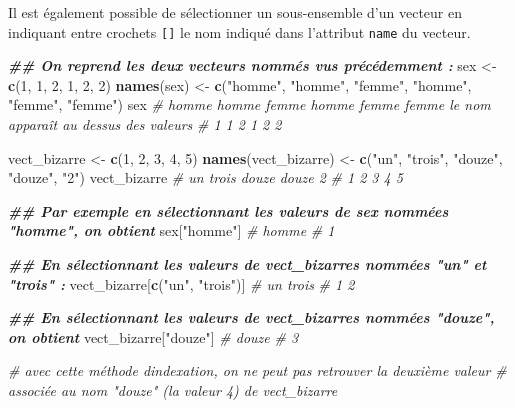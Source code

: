\documentclass[
]{book}
\newenvironment{Shaded}{\begin{snugshade}}{\end{snugshade}}
\newcommand{\CommentTok}[1]{\textcolor[rgb]{0.56,0.35,0.01}{\textit{#1}}}
\newcommand{\DecValTok}[1]{\textcolor[rgb]{0.00,0.00,0.81}{#1}}
\newcommand{\DocumentationTok}[1]{\textcolor[rgb]{0.56,0.35,0.01}{\textbf{\textit{#1}}}}
\newcommand{\FunctionTok}[1]{\textcolor[rgb]{0.13,0.29,0.53}{\textbf{#1}}}
\newcommand{\NormalTok}[1]{#1}
\newcommand{\OtherTok}[1]{\textcolor[rgb]{0.56,0.35,0.01}{#1}}
\newcommand{\StringTok}[1]{\textcolor[rgb]{0.31,0.60,0.02}{#1}}
\begin{document}
Il est également possible de sélectionner un sous-ensemble d'un vecteur en indiquant entre crochets \texttt{{[}{]}} le nom indiqué dans l'attribut \texttt{name} du vecteur.

\begin{Shaded}
\begin{Highlighting}[]
\DocumentationTok{\#\# On reprend les deux vecteurs nommés vus précédemment :}
\NormalTok{sex }\OtherTok{\textless{}{-}} \FunctionTok{c}\NormalTok{(}\DecValTok{1}\NormalTok{, }\DecValTok{1}\NormalTok{, }\DecValTok{2}\NormalTok{, }\DecValTok{1}\NormalTok{, }\DecValTok{2}\NormalTok{, }\DecValTok{2}\NormalTok{)}
\FunctionTok{names}\NormalTok{(sex) }\OtherTok{\textless{}{-}} \FunctionTok{c}\NormalTok{(}\StringTok{"homme"}\NormalTok{, }\StringTok{"homme"}\NormalTok{, }\StringTok{"femme"}\NormalTok{, }\StringTok{"homme"}\NormalTok{, }\StringTok{"femme"}\NormalTok{, }\StringTok{"femme"}\NormalTok{)}
\NormalTok{sex}
\CommentTok{\# homme homme femme homme femme femme     le nom apparaît au dessus des valeurs}
\CommentTok{\#     1     1     2     1     2     2}

\NormalTok{vect\_bizarre }\OtherTok{\textless{}{-}} \FunctionTok{c}\NormalTok{(}\DecValTok{1}\NormalTok{, }\DecValTok{2}\NormalTok{, }\DecValTok{3}\NormalTok{, }\DecValTok{4}\NormalTok{, }\DecValTok{5}\NormalTok{)}
\FunctionTok{names}\NormalTok{(vect\_bizarre) }\OtherTok{\textless{}{-}} \FunctionTok{c}\NormalTok{(}\StringTok{"un"}\NormalTok{, }\StringTok{"trois"}\NormalTok{, }\StringTok{"douze"}\NormalTok{, }\StringTok{"douze"}\NormalTok{, }\StringTok{"2"}\NormalTok{)}
\NormalTok{vect\_bizarre}
\CommentTok{\# un trois douze douze     2 }
\CommentTok{\#  1     2     3     4     5}

\DocumentationTok{\#\# Par exemple en sélectionnant les valeurs de sex nommées "homme", on obtient}
\NormalTok{sex[}\StringTok{"homme"}\NormalTok{]}
\CommentTok{\# homme }
\CommentTok{\#     1}

\DocumentationTok{\#\# En sélectionnant les valeurs de vect\_bizarres nommées "un" et "trois" :}
\NormalTok{vect\_bizarre[}\FunctionTok{c}\NormalTok{(}\StringTok{"un"}\NormalTok{, }\StringTok{"trois"}\NormalTok{)]}
\CommentTok{\# un trois }
\CommentTok{\#  1     2}

\DocumentationTok{\#\# En sélectionnant les valeurs de vect\_bizarres nommées "douze", on obtient}
\NormalTok{vect\_bizarre[}\StringTok{"douze"}\NormalTok{]}
\CommentTok{\# douze }
\CommentTok{\#     3}

\CommentTok{\# avec cette méthode d\textquotesingle{}indexation, on ne peut pas retrouver la deuxième valeur}
\CommentTok{\# associée au nom "douze" (la valeur 4) de vect\_bizarre}


\end{Highlighting}
\end{Shaded}
\end{document}
